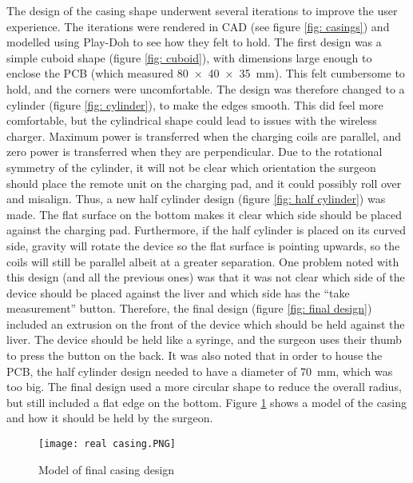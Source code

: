 The design of the casing shape underwent several iterations to improve the user experience. The iterations were rendered in CAD (see figure \ref{fig: casings}) and modelled using Play-Doh to see how they felt to hold. The first design was a simple cuboid shape (figure \ref{fig: cuboid}), with dimensions large enough to enclose the PCB (which measured \SI{80x40x35}{\milli\metre}). This felt cumbersome to hold, and the corners were uncomfortable. The design was therefore changed to a cylinder (figure \ref{fig: cylinder}), to make the edges smooth. This did feel more comfortable, but the cylindrical shape could lead to issues with the wireless charger. Maximum power is transferred when the charging coils are parallel, and zero power is transferred when they are perpendicular. Due to the rotational symmetry of the cylinder, it will not be clear which orientation the surgeon should place the remote unit on the charging pad, and it could possibly roll over and misalign. Thus, a new half cylinder design (figure \ref{fig: half cylinder}) was made. The flat surface on the bottom makes it clear which side should be placed against the charging pad. Furthermore, if the half cylinder is placed on its curved side, gravity will rotate the device so the flat surface is pointing upwards, so the coils will still be parallel albeit at a greater separation. One problem noted with this design (and all the previous ones) was that it was not clear which side of the device should be placed against the liver and which side has the ``take measurement'' button. Therefore, the final design (figure \ref{fig: final design}) included an extrusion on the front of the device which should be held against the liver. The device should be held like a syringe, and the surgeon uses their thumb to press the button on the back. It was also noted that in order to house the PCB, the half cylinder design needed to have a diameter of \SI{70}{\milli\metre}, which was too big. The final design used a more circular shape to reduce the overall radius, but still included a flat edge on the bottom. Figure \ref{fig: real casing} shows a model of the casing and how it should be held by the surgeon.\\

\begin{figure}[htbp]
	\centering
	\texttt{[image: real casing.PNG]}
	\caption{Model of final casing design}
	\label{fig: real casing}
\end{figure}





